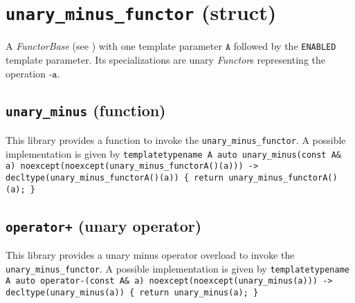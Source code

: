 \section{\texttt{unary\_minus\_functor} (struct)}
A \textit{FunctorBase} (see \cite{functors}) with one template parameter $\texttt{A}$ followed by the \texttt{ENABLED} template parameter.
Its specializations are unary \textit{Functor}s representing the operation $\texttt{-a}$.

\subsection{\texttt{unary\_minus} (function)}
This library provides a function to invoke the \texttt{unary\_minus\_functor}.
A possible implementation is given by\newline
\texttt{template\textlangle typename A\textrangle\newline
auto\newline
unary\_minus(const A\& a)\newline
noexcept(noexcept(unary\_minus\_functor\textlangle A\textrangle()(a)))\newline
-> decltype(unary\_minus\_functor\textlangle A\textrangle()(a))\newline
\{ return unary\_minus\_functor\textlangle A\textrangle()(a); \}}

\subsection{\texttt{operator+} (unary operator)}
This library provides a unary minus operator overload to invoke the \texttt{unary\_minus\_functor}.
A possible implementation is given by\newline
\texttt{template\textlangle typename A\textrangle\newline
auto\newline
operator-(const A\& a)\newline
noexcept(noexcept(unary\_minus(a)))\newline
-> decltype(unary\_minus(a))\newline
\{ return unary\_minus(a); \}}
